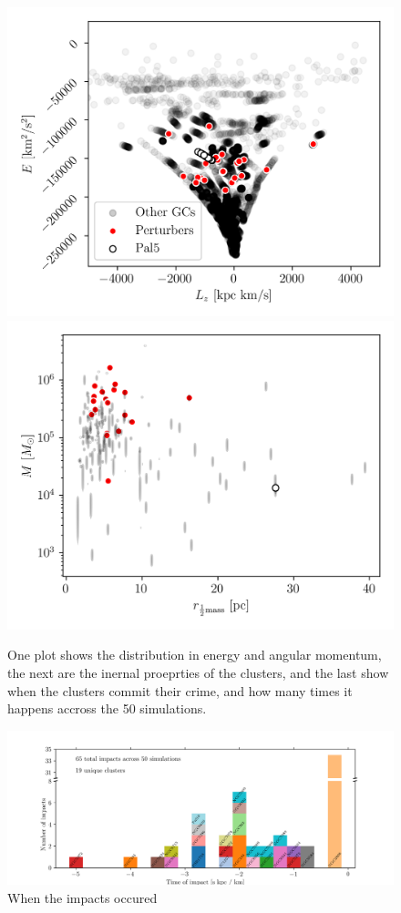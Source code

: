 \documentclass[]{aa}
\begin{document}
  \begin{figure}
    \centering
    \includegraphics[width=1\linewidth]{E_Lz_perturbers.png}
    \includegraphics[width=1\linewidth]{mass_size_plane.png}
    \caption{One plot shows the distribution in energy and angular momentum, the next are the inernal proeprties of the clusters, and the last show when the clusters commit their crime, and how many times it happens accross the 50 simulations. }
    \label{fig:mass_size_plane}
    \end{figure}
  \begin{figure}
    \centering
    \includegraphics[width=\linewidth]{histogram_impact_time.png}
    \caption{When the impacts occured}
    \label{fig:histogram_impact_time}
    \end{figure}
  
\end{document}
